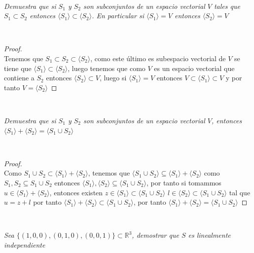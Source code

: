 \documentclass[11pt,letterpaper]{article}
\newcommand{\R}{\mathbb{R}}
\begin{document}
\,\\
\begin{tcolorbox}[
	title = \textcolor{black}{\textcolor{white}{Problema 6}},]
\textit{Demuestra que si $S_1$ y $S_2$ son subconjuntos de un espacio vectorial $V$ tales que $S_1\subset S_2$
entonces $\langle S_1 \rangle \subset \langle S_2 \rangle$. En particular si $\langle S_1 \rangle =V$ entonces $\langle S_2 \rangle =V$
}
\end{tcolorbox}\,\\
\begin{proof}\,\\
    Tenemos que $S_1\subset S_2\subset \langle S_2 \rangle$, como este \'ultimo es subespacio vectorial de $V$ se tiene que $\langle S_1 \rangle\subset \langle S_2 \rangle$, luego
    tenemos que como $V$ es un espacio vectorial que contiene a $S_2$ entonces $\langle S_2\rangle\subset V$, luego si $\langle S_1\rangle=V$ entonces $V\subset \langle S_1\rangle\subset V$ y
    por tanto $V=\langle S_2 \rangle$
\end{proof}\,\\
\newpage 
\begin{tcolorbox}[
	title = \textcolor{black}{\textcolor{white}{Problema 7}},]
\textit{Demuestra que si $S_1$ y $S_2$ son subconjuntos de un espacio vectorial $V$, entonces
$\langle S_1 \rangle+ \langle  S_2\rangle=\langle S_1\cup S_2 \rangle  $
}
\end{tcolorbox}\,\\
\begin{proof}\,\\
    Como $S_1\cup S_2\subset \langle S_1\rangle+\langle S_2\rangle$, tenemos que $\langle S_1 \cup S_2\rangle\subseteq\langle S_1\rangle+\langle S_2\rangle $
    como $S_1,S_2\subseteq S_1\cup S_2$ entonces $\langle S_1 \rangle,\langle S_2 \rangle\subseteq \langle S_1 \cup S_2 \rangle$, por tanto si tomammos $u\in \langle S_1\rangle+\langle S_2\rangle$, entonces existen $z\in \langle S_1\rangle\subset \langle S_1\cup S_2 \rangle$
    $l\in \langle S_2 \rangle\subset\langle S_1\cup S_2 \rangle$ tal que $u=z+l$ por tanto $\langle S_1\rangle+\langle S_2\rangle\subset\langle S_1 \cup S_2\rangle $, por tanto
    $\langle S_1 \rangle+ \langle  S_2\rangle=\langle S_1\cup S_2 \rangle  $
\end{proof}\,\\
\begin{tcolorbox}[
	title = \textcolor{black}{\textcolor{white}{Problema 8}},]
\textit{Sea $\{(1,0,0),(0,1,0),(0,0,1)\}\subset \R^3$, demostrar que $S$ es linealmente independiente
}
\end{tcolorbox}\,\\
\end{document}
